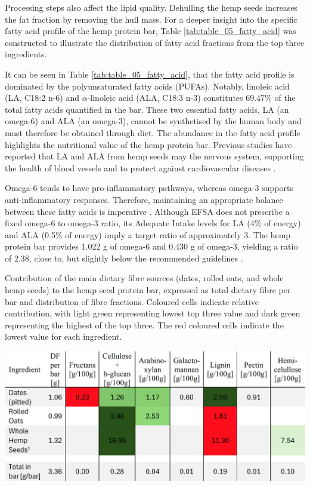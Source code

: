 \vspace{1em}
Processing steps also affect the lipid quality. Dehulling the hemp seeds increases the fat fraction by removing the hull mass. For a deeper insight into the specific fatty acid profile of the hemp protein bar, Table \ref*{tab:table_05_fatty_acid} was constructed to illustrate the distribution of fatty acid fractions from the top three ingredients. 

\vspace{1em}
It can be seen in Table \ref*{tab:table_05_fatty_acid}, that the fatty acid profile is dominated by the polyunsaturated fatty acids (PUFAs). Notably, linoleic acid (LA, C18:2 n-6) and $\alpha$-linoleic acid (ALA, C18:3 n-3) constitutes 69.47\% of the total fatty acids quantified in the bar. These two essential fatty acids, LA (an omega-6) and ALA (an omega-3), cannot be synthetised by the human body and must therefore be obtained through diet. The abundance in the fatty acid profile highlights the nutritional value of the hemp protein bar. Previous studies have reported that LA and ALA from hemp seeds may the nervous system, supporting the health of blood vessels and to protect against cardiovascular diseases \cite*{art_21_hemp_review}. 

\vspace{1em}
Omega-6 tends to have pro-inflammatory pathways, whereas omega-3 supports anti-inflammatory responses. Therefore, maintaining an appropriate balance between these fatty acids is imperative \cite*{art_21_hemp_review}. Although EFSA does not prescribe a fixed omega-6 to omega-3 ratio, its Adequate Intake levels for LA (4\% of energy) and ALA (0.5\% of energy) imply a target ratio of approximately 3. The hemp protein bar provides 1.022 g of omega-6 and 0.430 g of omega-3, yielding a ratio of 2.38, close to, but slightly below the recommended guidelines \cite*{art_22_efsa_fats}. 

\begin{table}[H]
    \centering
    \caption{Contribution of the main dietary fibre sources (dates, rolled oats, and whole hemp seeds) to the hemp seed protein bar,
    expressed as total dietary fibre per bar and distribution of fibre fractions. Coloured cells indicate relative contribution, with light
    green representing lowest top three value and dark green representing the highest of the top three. The red coloured cells indicate the
    lowest value for each ingredient.}
    \label{tab:table_04_dietary_fibre}
    \includegraphics[width=\linewidth]{Figures/tab_df_01.png}
\end{table}

